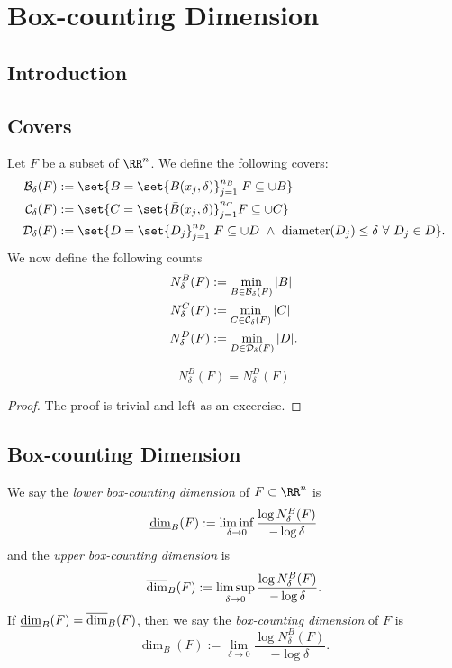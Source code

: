 
\chapter{Box-counting Dimension}

\section{Introduction}

\section{Covers}

Let $F$ be a subset of $\RR^n$.
We define the following covers:
\begin{align*}
	\mcb_\delta(F)&:=\set{B=\set{B(x_j,\delta)}_{j=1}^{n_B}| F\subseteq \cup B}\\
	\mcc_\delta(F)&:=\set{C=\set{\bar{B}(x_j,\delta)}_{j=1}^{n_C} F\subseteq \cup C}\\
	\mcd_\delta(F)&:=\set{D=\set{D_j}_{j=1}^{n_D}| F\subseteq \cup D \,\,\wedge\,\, \diam(D_j)\leq\delta\,\, \forall\,\, D_j\in D}.
\end{align*}
We now define the following counts
\begin{align*}
	N^B_\delta(F)&:=\min\limits_{B\in\mathcal{B}_\delta(F)}|B|\\
	N^C_\delta(F)&:=\min\limits_{C\in\mathcal{C}_\delta(F)}|C|\\
	N^D_\delta(F)&:=\min\limits_{D\in\mathcal{D}_\delta(F)}|D|.
\end{align*}

\begin{thm}
	\[
		N^B_\delta(F)=N^D_\delta(F)
	\]
\end{thm}
\begin{proof}
	The proof is trivial and left as an excercise.
\end{proof}

\section{Box-counting Dimension}

\begin{definition}
	We say the \textit{lower box-counting dimension} of $F\subset\RR^n$ is
	\[
		\underline{\operatorname{dim}}_B(F):=\liminf\limits_{\delta\rightarrow 0} \frac{\log N^B_\delta(F)}{-\log\delta}
	\]
	and the \textit{upper box-counting dimension} is
	\[
		\overline{\operatorname{dim}}_B(F):=\limsup\limits_{\delta\rightarrow 0} \frac{\log N^B_\delta(F)}{-\log\delta}.
	\]
	If $\underline{\operatorname{dim}}_B(F)=\overline{\operatorname{dim}}_B(F)$, then we say the \textit{box-counting dimension} of $F$ is
	\[
		\dim_B(F):=\lim\limits_{\delta\rightarrow 0} \frac{\log N^B_\delta(F)}{-\log\delta}.
	\]
\end{definition}

